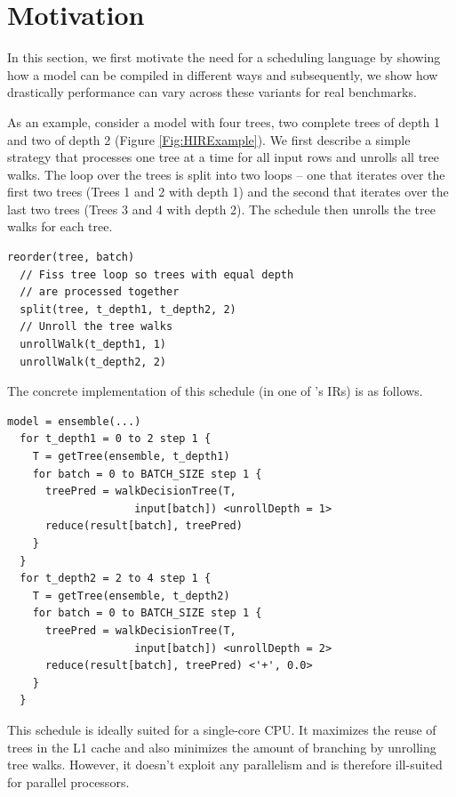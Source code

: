 \section{Motivation}

In this section, we first motivate the need for a scheduling language 
by showing how a model can be compiled in different ways
and subsequently, we show how drastically 
performance can vary across these variants for real benchmarks.

As an example, consider a model with four trees, two complete
trees of depth 1 and two of depth 2 (Figure \ref{Fig:HIRExample}).
We first describe a simple strategy that processes one tree at a time 
for all input rows and unrolls all tree walks. 
The loop over the trees is split into two loops -- one that
iterates over the first two trees (Trees 1 and 2 with depth 1) and 
the second that iterates over the last two trees (Trees 3 and 4 with
depth 2). The \Treebeard{} schedule then unrolls the tree walks for each tree.
\begin{lstlisting}[style=c++]
  reorder(tree, batch)
  // Fiss tree loop so trees with equal depth 
  // are processed together  
  split(tree, t_depth1, t_depth2, 2)
  // Unroll the tree walks
  unrollWalk(t_depth1, 1)
  unrollWalk(t_depth2, 2)
\end{lstlisting}
The concrete implementation of this schedule (in one of \Treebeard{}'s IRs) 
is as follows.
\begin{lstlisting}[style=c++]
  model = ensemble(...)
  for t_depth1 = 0 to 2 step 1 {
    T = getTree(ensemble, t_depth1)
    for batch = 0 to BATCH_SIZE step 1 {
      treePred = walkDecisionTree(T, 
                    input[batch]) <unrollDepth = 1>
      reduce(result[batch], treePred)
    }
  }
  for t_depth2 = 2 to 4 step 1 {
    T = getTree(ensemble, t_depth2)
    for batch = 0 to BATCH_SIZE step 1 {
      treePred = walkDecisionTree(T,
                    input[batch]) <unrollDepth = 2>
      reduce(result[batch], treePred) <'+', 0.0>
    }
  }
\end{lstlisting}
This schedule is ideally suited for a single-core CPU. It maximizes 
the reuse of trees in the L1 cache and also minimizes the amount of
branching by unrolling tree walks. However, it doesn't exploit  
any parallelism and is therefore ill-suited for parallel processors.

